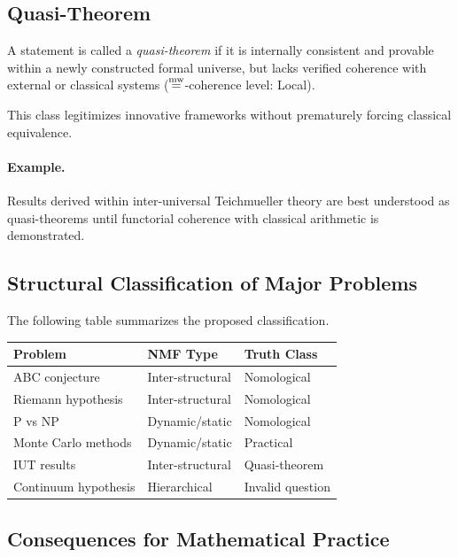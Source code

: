 \documentclass[11pt]{article}
\begin{document}
\subsection{Quasi-Theorem}

\begin{definition}
A statement is called a \emph{quasi-theorem} if it is internally
consistent and provable within a newly constructed formal universe,
but lacks verified coherence with external or classical systems ($\mathrel{\overset{\mathrm{mw}}{=}}$-coherence level: Local).
\end{definition}

This class legitimizes innovative frameworks without prematurely
forcing classical equivalence.

\paragraph{Example.}
Results derived within inter-universal Teichmueller theory are best
understood as quasi-theorems until functorial coherence with classical
arithmetic is demonstrated.

\subsection{Structural Classification of Major Problems}



The following table summarizes the proposed classification.

\begin{center}
\begin{tabular}{|l|l|l|}
\hline
Problem & NMF Type & Truth Class \\
\hline
ABC conjecture & Inter-structural & Nomological \\
Riemann hypothesis & Inter-structural & Nomological \\
P vs NP & Dynamic/static & Nomological \\
Monte Carlo methods & Dynamic/static & Practical \\
IUT results & Inter-structural & Quasi-theorem \\
Continuum hypothesis & Hierarchical & Invalid question \\
\hline
\end{tabular}
\end{center}

\subsection{Consequences for Mathematical Practice}
\end{document}
